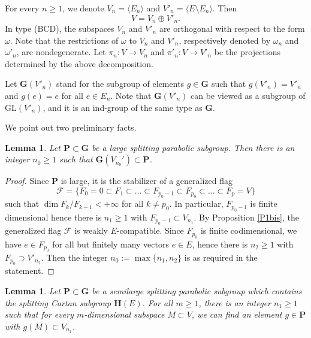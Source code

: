 \documentclass[12pt]{amsart}
\newcommand{\GL}{\mathrm{GL}}
\newcommand{\G}{\mathbf{G}}
\renewcommand{\H}{\mathbf{H}}
\renewcommand{\P}{\mathbf{P}}
\newcommand{\Ff}{\mathcal{F}}
\renewcommand{\span}[1]{\langle #1\rangle}
\numberwithin{equation}{section}
\newtheorem{lemma}[theorem]{Lemma}
\theoremstyle{definition}
\begin{document}
For every $n\geq 1$, we denote $V_n=\span{E_n}$ and $V'_n=\span{E\setminus E_n}$. Then
\[V=V_n\oplus V'_n.\]
In type (BCD), the subspaces $V_n$ and $V'_n$ are orthogonal with respect to the form $\omega$. Note that the restrictions of $\omega$ to $V_n$ and $V'_n$, respectively denoted by $\omega_n$ and $\omega'_n$, are nondegenerate. Let $\pi_n:V\to V_n$ and $\pi'_n:V\to V'_n$ be the projections determined by  the above decomposition.

Let $\G(V'_n)$ stand for the subgroup of elements $g\in\G$ such that 
$g(V'_n)= V'_n$ and $g(e)=e$ for all $e\in E_n$. Note that $\G(V'_n)$ can be viewed as a subgroup of $\GL(V'_n)$, and it is an ind-group of the same type as $\G$. 

We point out two preliminary facts.

\begin{lemma}
\label{L6}
Let $\P\subset \G$ be a large splitting parabolic subgroup. %
Then there is an integer $n_0\geq 1$ such that $\G(V_{n_0}')\subset \P$.
\end{lemma}

\begin{proof}
Since $\P$ is large, it is the stabilizer of a generalized flag
\[\Ff=\{F_0=0\subset F_1\subset\ldots\subset F_{p_0-1}\subset F_{p_0}\subset\ldots\subset F_p=V\}\]
such that $\dim F_k/F_{k-1}<+\infty$ for all $k\not=p_0$. In particular, $F_{p_0-1}$ is finite dimensional hence
there is $n_1\geq 1$ with $F_{p_0-1}\subset V_{n_1}$. 
By Proposition \ref{P1bis}, the generalized flag $\Ff$ is weakly $E$-compatible.
Since $F_{p_0}$ is finite codimensional, we have $e\in F_{p_0}$ for all but finitely many vectors $e\in E$, hence there is $n_2\geq 1$ with $F_{p_0}\supset V'_{n_2}$. Then the integer $n_0:=\max\{n_1,n_2\}$ is as required in the statement.
\end{proof}

\begin{lemma}
\label{L6bis}
Let $\P\subset \G$ be a semilarge splitting parabolic subgroup which contains the splitting Cartan subgroup $\H(E)$.
For all $m\geq 1$, there is an integer $n_1\geq 1$ such that for every $m$-dimensional subspace $M\subset V$, we can find
an element $g\in\P$ with $g(M)\subset V_{n_1}$.
\end{lemma}
\end{document}
